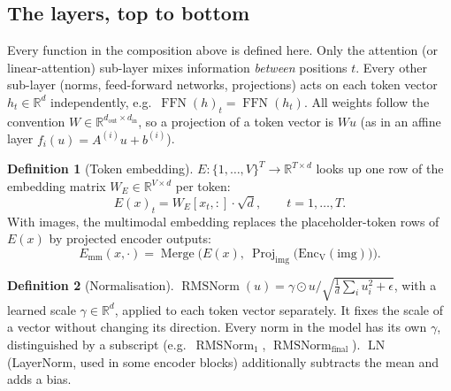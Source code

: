 \documentclass[10pt,a4paper]{article}
\newcommand{\op}[1]{\operatorname{#1}}
\theoremstyle{definition}
\newtheorem{definition}{Definition}[section]
\begin{document}
\subsection{The layers, top to bottom}\label{sec:layers}
Every function in the composition above is defined here. Only the attention (or linear-attention) sub-layer mixes information \emph{between} positions $t$. Every other sub-layer (norms, feed-forward networks, projections) acts on each token vector $h_t\in\mathbb{R}^{d}$ independently, e.g.\ $\op{FFN}(h)_t=\op{FFN}(h_t)$. All weights follow the convention $W\in\mathbb{R}^{d_{\mathrm{out}}\times d_{\mathrm{in}}}$, so a projection of a token vector is $W u$ (as in an affine layer $f_i(u)=A^{(i)}u+b^{(i)}$).
\begin{definition}[Token embedding]\label{def:embed}
$E:\{1,\dots,V\}^{T}\to\mathbb{R}^{T\times d}$ looks up one row of the embedding matrix $W_E\in\mathbb{R}^{V\times d}$ per token:
\begin{equation}
  E(x)_t = W_E[x_t,:]\cdot\sqrt{d},\qquad t=1,\dots,T.
\end{equation}
With images, the multimodal embedding replaces the placeholder-token rows of $E(x)$ by projected encoder outputs:
\begin{equation}
  E_{\mathrm{mm}}(x,\cdot) = \op{Merge}\Big(E(x),\ \op{Proj}_{\mathrm{img}}\big(\op{Enc_V}(\mathrm{img})\big)\Big).
\end{equation}
\end{definition}
\begin{definition}[Normalisation]
$\op{RMSNorm}(u)=\gamma\odot u/\sqrt{\tfrac1d\sum_i u_i^2+\epsilon}$, with a learned scale $\gamma\in\mathbb{R}^{d}$, applied to each token vector separately. It fixes the scale of a vector without changing its direction. Every norm in the model has its own $\gamma$, distinguished by a subscript (e.g.\ $\op{RMSNorm}_1$, $\op{RMSNorm}_{\mathrm{final}}$). $\op{LN}$ (LayerNorm, used in some encoder blocks) additionally subtracts the mean and adds a bias.
\end{definition}
\end{document}
